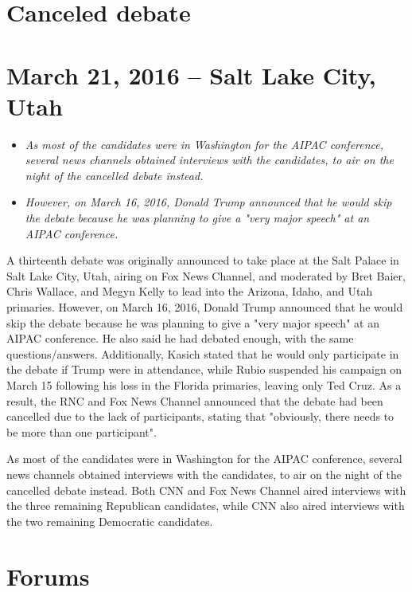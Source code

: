 \section{Canceled debate}\label{canceled-debate}

\section{March 21, 2016 -- Salt Lake City,
Utah}\label{march-21-2016-salt-lake-city-utah}

\begin{itemize}
\item
  \emph{As most of the candidates were in Washington for the AIPAC
  conference, several news channels obtained interviews with the
  candidates, to air on the night of the cancelled debate instead.}
\item
  \emph{However, on March 16, 2016, Donald Trump announced that he would
  skip the debate because he was planning to give a "very major speech"
  at an AIPAC conference.}
\end{itemize}

A thirteenth debate was originally announced to take place at the Salt
Palace in Salt Lake City, Utah, airing on Fox News Channel, and
moderated by Bret Baier, Chris Wallace, and Megyn Kelly to lead into the
Arizona, Idaho, and Utah primaries. However, on March 16, 2016, Donald
Trump announced that he would skip the debate because he was planning to
give a "very major speech" at an AIPAC conference. He also said he had
debated enough, with the same questions/answers. Additionally, Kasich
stated that he would only participate in the debate if Trump were in
attendance, while Rubio suspended his campaign on March 15 following his
loss in the Florida primaries, leaving only Ted Cruz. As a result, the
RNC and Fox News Channel announced that the debate had been cancelled
due to the lack of participants, stating that "obviously, there needs to
be more than one participant".

As most of the candidates were in Washington for the AIPAC conference,
several news channels obtained interviews with the candidates, to air on
the night of the cancelled debate instead. Both CNN and Fox News Channel
aired interviews with the three remaining Republican candidates, while
CNN also aired interviews with the two remaining Democratic candidates.

\section{Forums}\label{forums}


